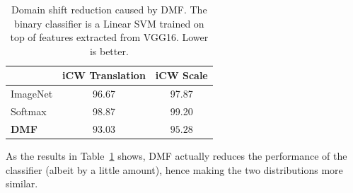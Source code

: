 \documentclass[../main.tex]{subfiles}
\begin{document}
    \begin{table}[!ht]
        \centering{}
        \begin{tabular}{l c c}
            \toprule
            & iCW Translation & iCW Scale \\
            \midrule
            ImageNet & 96.67 & 97.87 \\
            Softmax  & 98.87 & 99.20 \\
        \textbf{DMF} & $\mathbf{93.03}$ & $\mathbf{95.28}$ \\
            \bottomrule
        \end{tabular}
        \caption{Domain shift reduction caused by DMF\@. The binary classifier is a Linear SVM trained on top of
        features extracted from VGG16. Lower is better.}\label{table:domain-shift-dmf}
    \end{table}
    
    As the results in Table~\ref{table:domain-shift-dmf}
    shows, DMF actually reduces the performance of the classifier (albeit by a little amount), hence making the
    two distributions more similar.
\end{document}

